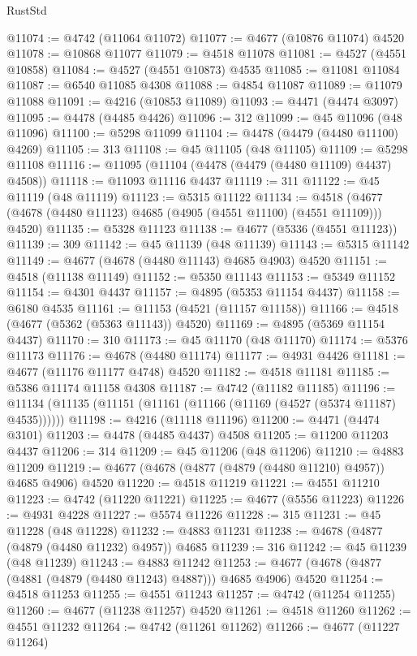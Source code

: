 \begin{lexlean}{RustStd}
\begin{coremodule}
@11074 := @4742 (@11064 @11072)
@11077 := @4677 (@10876 @11074) @4520
@11078 := @10868 @11077
@11079 := @4518 @11078
@11081 := @4527 (@4551 @10858)
@11084 := @4527 (@4551 @10873) @4535
@11085 := @11081 @11084
@11087 := @6540 @11085 @4308
@11088 := @4854 @11087
@11089 := @11079 @11088
@11091 := @4216 (@10853 @11089)
@11093 := @4471 (@4474 @3097)
@11095 := @4478 (@4485 @4426)
@11096 := 312
@11099 := @45 @11096 (@48 @11096)
@11100 := @5298 @11099
@11104 := @4478 (@4479 (@4480 @11100) @4269)
@11105 := 313
@11108 := @45 @11105 (@48 @11105)
@11109 := @5298 @11108
@11116 := @11095 (@11104 (@4478 (@4479 (@4480 @11109) @4437) @4508))
@11118 := @11093 @11116 @4437
@11119 := 311
@11122 := @45 @11119 (@48 @11119)
@11123 := @5315 @11122
@11134 := @4518 (@4677 (@4678 (@4480 @11123) @4685 (@4905 (@4551 @11100) (@4551 @11109))) @4520)
@11135 := @5328 @11123
@11138 := @4677 (@5336 (@4551 @11123))
@11139 := 309
@11142 := @45 @11139 (@48 @11139)
@11143 := @5315 @11142
@11149 := @4677 (@4678 (@4480 @11143) @4685 @4903) @4520
@11151 := @4518 (@11138 @11149)
@11152 := @5350 @11143
@11153 := @5349 @11152
@11154 := @4301 @4437
@11157 := @4895 (@5353 @11154 @4437)
@11158 := @6180 @4535
@11161 := @11153 (@4521 (@11157 @11158))
@11166 := @4518 (@4677 (@5362 (@5363 @11143)) @4520)
@11169 := @4895 (@5369 @11154 @4437)
@11170 := 310
@11173 := @45 @11170 (@48 @11170)
@11174 := @5376 @11173
@11176 := @4678 (@4480 @11174)
@11177 := @4931 @4426
@11181 := @4677 (@11176 @11177 @4748) @4520
@11182 := @4518 @11181
@11185 := @5386 @11174 @11158 @4308
@11187 := @4742 (@11182 @11185)
@11196 := @11134 (@11135 (@11151 (@11161 (@11166 (@11169 (@4527 (@5374 @11187) @4535))))))
@11198 := @4216 (@11118 @11196)
@11200 := @4471 (@4474 @3101)
@11203 := @4478 (@4485 @4437) @4508
@11205 := @11200 @11203 @4437
@11206 := 314
@11209 := @45 @11206 (@48 @11206)
@11210 := @4883 @11209
@11219 := @4677 (@4678 (@4877 (@4879 (@4480 @11210) @4957)) @4685 @4906) @4520
@11220 := @4518 @11219
@11221 := @4551 @11210
@11223 := @4742 (@11220 @11221)
@11225 := @4677 (@5556 @11223)
@11226 := @4931 @4228
@11227 := @5574 @11226
@11228 := 315
@11231 := @45 @11228 (@48 @11228)
@11232 := @4883 @11231
@11238 := @4678 (@4877 (@4879 (@4480 @11232) @4957)) @4685
@11239 := 316
@11242 := @45 @11239 (@48 @11239)
@11243 := @4883 @11242
@11253 := @4677 (@4678 (@4877 (@4881 (@4879 (@4480 @11243) @4887))) @4685 @4906) @4520
@11254 := @4518 @11253
@11255 := @4551 @11243
@11257 := @4742 (@11254 @11255)
@11260 := @4677 (@11238 @11257) @4520
@11261 := @4518 @11260
@11262 := @4551 @11232
@11264 := @4742 (@11261 @11262)
@11266 := @4677 (@11227 @11264)

\end{coremodule}
\end{lexlean}
